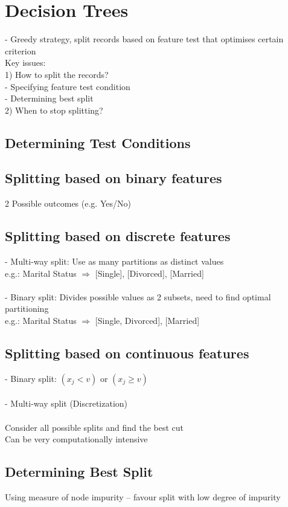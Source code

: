 \section{Decision Trees}
- Greedy strategy, split records based on feature test that optimises
certain criterion\\
Key issues:\\
1) How to split the records?\\
- Specifying feature test condition\\
- Determining best split\\
2) When to stop splitting?\\
\subsection*{Determining Test Conditions}
\subsection*{Splitting based on binary features}
2 Possible outcomes (e.g. Yes/No)
\subsection*{Splitting based on discrete features}
- Multi-way split: Use as many partitions as distinct values\\
e.g.: Marital Status $\Rightarrow$ [Single], [Divorced], [Married]
\\\\
- Binary split: Divides possible values as 2 subsets, need to find optimal 
partitioning\\
e.g.: Marital Status $\Rightarrow$ [{Single, Divorced}], [Married]
\subsection*{Splitting based on continuous features}
- Binary split: $(x_j < v)$ or $(x_j \geq v)$\\\\
- Multi-way split (Discretization)\\\\
Consider all possible splits and find the best cut\\
Can be very computationally intensive\\
\subsection*{Determining Best Split}
Using measure of node impurity -- favour split with low degree of impurity
